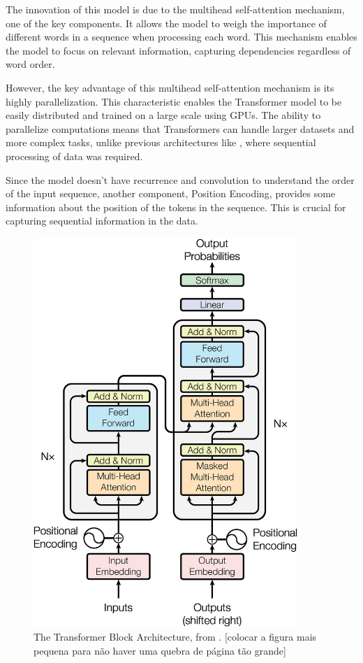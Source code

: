 The innovation of this model is due to the multihead self-attention mechanism, one of the key components. It allows the model to weigh the importance of different words in a sequence when processing each word. This mechanism enables the model to focus on relevant information, capturing dependencies regardless of word order. 

However, the key advantage of this multihead self-attention mechanism is its highly parallelization. This characteristic enables the Transformer model to be easily distributed and trained on a large scale using GPUs. The ability to parallelize computations means that Transformers can handle larger datasets and more complex tasks, unlike previous architectures like {\rnn}, where sequential processing of data was required.

Since the model doesn't have recurrence and convolution to understand the order of the input sequence, another component, Position Encoding, provides some information about the position of the tokens in the sequence. This is crucial for capturing sequential information in the data. 

\begin{figure}[ht]
    \includegraphics[width=10cm]{figs/chapter2/transformer.png}
    \centering
    \caption{The Transformer Block Architecture, from \citet{vaswani_attention_2023}. [colocar a figura mais pequena para não haver uma quebra de página tão grande]}
    \label{fig_trans_arch}
\end{figure}


